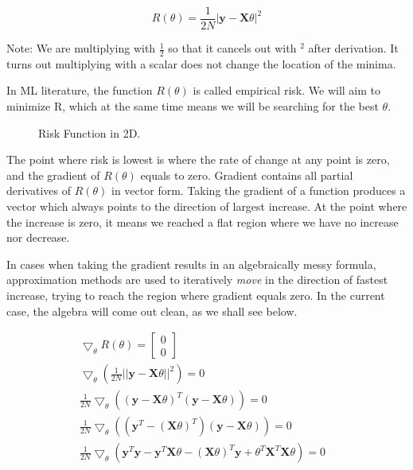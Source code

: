 \documentclass{ecctd01} %
\begin{document}
\begin{equation}
  \label{eq:reg5}
  R(\theta) = \frac{1}{2N}|\mathbf{y} - \mathbf{X}\theta|^2
\end{equation}

Note: We are multiplying with $\frac{1}{2}$ so that it cancels out
with $^2$ after derivation. It turns out multiplying with a scalar
does not change the location of the minima.

In ML literature, the function $R(\theta)$ is called empirical
risk. We will aim to minimize R, which at the same time means we will  
be searching for the best $\theta$. 

\begin{figure}[htpb]
  \vspace{3.0cm}  
  \caption{\label{risk} Risk Function in 2D.}
\end{figure}

The point where risk is lowest is where the rate of change at any
point is zero, and the gradient of $R(\theta)$ equals to
zero. Gradient contains all partial derivatives of $R(\theta)$ in
vector form. Taking the gradient of a function produces a vector
which always points to the direction of largest increase. At 
the point where the increase is zero, it means we reached a flat
region where we have no increase nor decrease.

In cases when taking the gradient results in an algebraically messy
formula, approximation  methods are used to iteratively {\em move} in the
direction of fastest increase, trying to reach the region where
gradient equals zero. In the current case, the algebra will come out clean,
as we shall see below.

\begin{eqnarray*}
  \label{eq:reg6}
  \bigtriangledown_{\theta} R\left(\theta\right) = \left[ \begin{array}{c}
      0 \\
      0 
    \end{array} \right] &  \nonumber \\
  \bigtriangledown_{\theta}\left( \frac{1}{2N}||\mathbf{y} -
  \mathbf{X}\theta||^2\right) = 0 \nonumber \\
  \frac{1}{2N}  \bigtriangledown_{\theta} \left(
  \left(\mathbf{y} -  \mathbf{X}\theta \right) ^T
  \left( \mathbf{y} -  \mathbf{X}\theta \right)
  \right) = 0 \nonumber \\
  \frac{1}{2N}  \bigtriangledown_{\theta} \left(
  \left(\mathbf{y}^T -  \left(\mathbf{X}\theta\right)^T \right)
  \left( \mathbf{y} -  \mathbf{X}\theta \right)
  \right) = 0 \nonumber \\
  \frac{1}{2N}  \bigtriangledown_{\theta} \left(
  \mathbf{y}^T\mathbf{y} -
  \mathbf{y}^T\mathbf{X}\theta -
  \left( \mathbf{X}\theta \right)^T\mathbf{y} +
  \theta^T\mathbf{X}^T\mathbf{X}\theta
  \right) = 0 \nonumber 
\end{eqnarray*}
\end{document}
